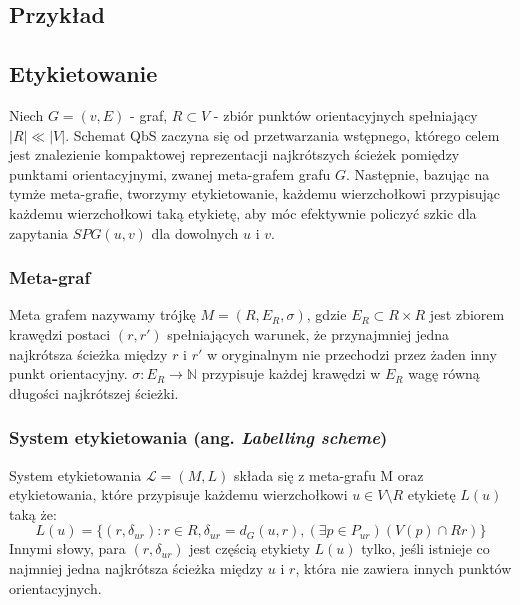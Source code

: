 \documentclass{article}
\theoremstyle{definition}
\begin{document}
    \subsection{Przykład}
     
    \subsection{Etykietowanie}
        Niech $G = (v, E)$ - graf, $R \subset V$ - zbiór punktów orientacyjnych spełniający $|R| \ll |V|$. Schemat QbS zaczyna się od przetwarzania wstępnego, którego celem jest znalezienie kompaktowej reprezentacji najkrótszych ścieżek pomiędzy punktami orientacyjnymi, zwanej meta-grafem grafu $G$. Następnie, bazując na tymże meta-grafie, tworzymy etykietowanie, każdemu wierzchołkowi przypisując każdemu wierzchołkowi taką etykietę, aby móc efektywnie policzyć szkic dla zapytania $SPG(u, v)$  dla dowolnych $u$ i $v$.

        \subsubsection*{Meta-graf}
            Meta grafem nazywamy trójkę $M = (R, E_R, \sigma)$, gdzie $E_R \subset R \times R$ jest zbiorem krawędzi postaci $(r, r')$ spełniających warunek, że przynajmniej jedna najkrótsza ścieżka między $r$ i $r'$ w oryginalnym nie przechodzi przez żaden inny punkt orientacyjny. $\sigma: E_R \rightarrow \mathbb{N}$ przypisuje każdej krawędzi w $E_R$ wagę równą długości najkrótszej ścieżki. 

        \subsubsection*{System etykietowania (ang. \textit{Labelling scheme})}
            System etykietowania $\mathcal{L} = (M,L)$ składa się z meta-grafu M oraz etykietowania, które przypisuje każdemu wierzchołkowi $u \in V \setminus R$ etykietę $L(u)$ taką że:
            \[ 
                L(u) = \{(r, \delta_{ur}) : r \in R, \delta_{ur} = d_G(u,r), (\exists p \in P_{ur})(V(p) \cap R {r}) \}
            \]
            Innymi słowy, para $(r, \delta_{ur})$ jest częścią etykiety $L(u)$ tylko, jeśli istnieje co najmniej jedna najkrótsza ścieżka między $u$ i $r$, która nie zawiera innych punktów orientacyjnych. 
\end{document}
